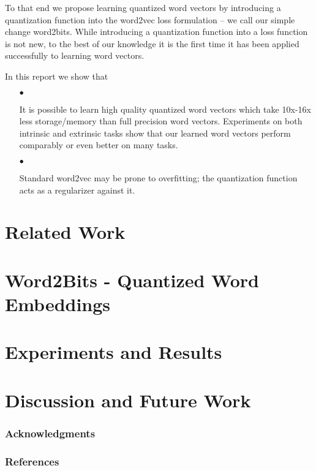 \documentclass{article} %
\begin{document}
To that end we propose learning quantized word vectors by introducing
a quantization function into the word2vec loss formulation -- we call
our simple change word2bits. While introducing a quantization function
into a loss function is not new, to the best of our knowledge it is
the first time it has been applied successfully to learning word
vectors.

In this report we show that
\begin{enumerate}
\item[$\bullet$]

  It is possible to learn high quality quantized word vectors which
  take 10x-16x less storage/memory than full precision word
  vectors. Experiments on both intrinsic and extrinsic tasks show that
  our learned word vectors perform comparably or even better on many tasks.

\item[$\bullet$]

  Standard word2vec may be prone to overfitting; the quantization
  function acts as a regularizer against it.

\end{enumerate}

\section{Related Work}


\section{Word2Bits - Quantized Word Embeddings}

\section{Experiments and Results}

\section{Discussion and Future Work}

\subsubsection*{Acknowledgments}

\subsubsection*{References}
\end{document}
